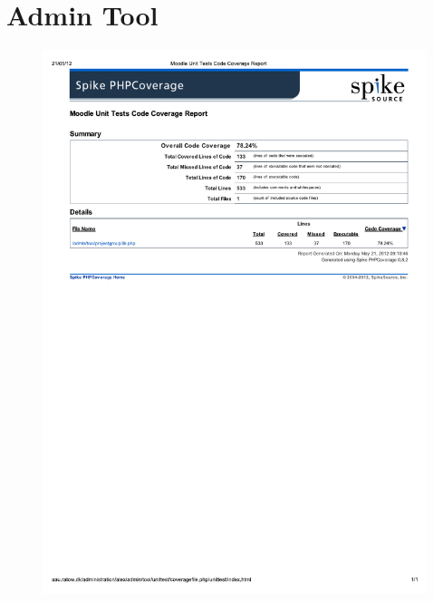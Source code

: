 \section{Admin Tool}
\label{app:admincc}
\begin{figure}[h]
	\centering
		\includegraphics[trim=0cm 15cm 0cm 0cm,clip=true,width=\textwidth]{images/adminprojectgroupccreport.pdf}
	\label{fig:adminprojectgroupccreport}
\end{figure}

\pagebreak{}